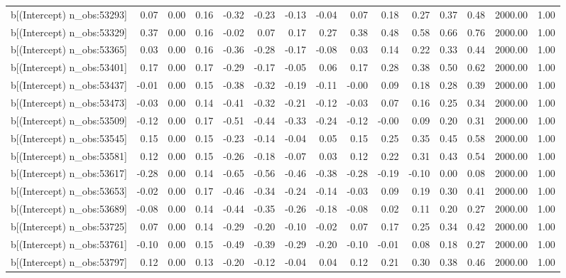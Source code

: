 \begin{table}[ht]
\begin{tabular}{rrrrrrrrrrrrrrr}
  b[(Intercept) n\_obs:53293] & 0.07 & 0.00 & 0.16 & -0.32 & -0.23 & -0.13 & -0.04 & 0.07 & 0.18 & 0.27 & 0.37 & 0.48 & 2000.00 & 1.00 \\ 
  b[(Intercept) n\_obs:53329] & 0.37 & 0.00 & 0.16 & -0.02 & 0.07 & 0.17 & 0.27 & 0.38 & 0.48 & 0.58 & 0.66 & 0.76 & 2000.00 & 1.00 \\ 
  b[(Intercept) n\_obs:53365] & 0.03 & 0.00 & 0.16 & -0.36 & -0.28 & -0.17 & -0.08 & 0.03 & 0.14 & 0.22 & 0.33 & 0.44 & 2000.00 & 1.00 \\ 
  b[(Intercept) n\_obs:53401] & 0.17 & 0.00 & 0.17 & -0.29 & -0.17 & -0.05 & 0.06 & 0.17 & 0.28 & 0.38 & 0.50 & 0.62 & 2000.00 & 1.00 \\ 
  b[(Intercept) n\_obs:53437] & -0.01 & 0.00 & 0.15 & -0.38 & -0.32 & -0.19 & -0.11 & -0.00 & 0.09 & 0.18 & 0.28 & 0.39 & 2000.00 & 1.00 \\ 
  b[(Intercept) n\_obs:53473] & -0.03 & 0.00 & 0.14 & -0.41 & -0.32 & -0.21 & -0.12 & -0.03 & 0.07 & 0.16 & 0.25 & 0.34 & 2000.00 & 1.00 \\ 
  b[(Intercept) n\_obs:53509] & -0.12 & 0.00 & 0.17 & -0.51 & -0.44 & -0.33 & -0.24 & -0.12 & -0.00 & 0.09 & 0.20 & 0.31 & 2000.00 & 1.00 \\ 
  b[(Intercept) n\_obs:53545] & 0.15 & 0.00 & 0.15 & -0.23 & -0.14 & -0.04 & 0.05 & 0.15 & 0.25 & 0.35 & 0.45 & 0.58 & 2000.00 & 1.00 \\ 
  b[(Intercept) n\_obs:53581] & 0.12 & 0.00 & 0.15 & -0.26 & -0.18 & -0.07 & 0.03 & 0.12 & 0.22 & 0.31 & 0.43 & 0.54 & 2000.00 & 1.00 \\ 
  b[(Intercept) n\_obs:53617] & -0.28 & 0.00 & 0.14 & -0.65 & -0.56 & -0.46 & -0.38 & -0.28 & -0.19 & -0.10 & 0.00 & 0.08 & 2000.00 & 1.00 \\ 
  b[(Intercept) n\_obs:53653] & -0.02 & 0.00 & 0.17 & -0.46 & -0.34 & -0.24 & -0.14 & -0.03 & 0.09 & 0.19 & 0.30 & 0.41 & 2000.00 & 1.00 \\ 
  b[(Intercept) n\_obs:53689] & -0.08 & 0.00 & 0.14 & -0.44 & -0.35 & -0.26 & -0.18 & -0.08 & 0.02 & 0.11 & 0.20 & 0.27 & 2000.00 & 1.00 \\ 
  b[(Intercept) n\_obs:53725] & 0.07 & 0.00 & 0.14 & -0.29 & -0.20 & -0.10 & -0.02 & 0.07 & 0.17 & 0.25 & 0.34 & 0.42 & 2000.00 & 1.00 \\ 
  b[(Intercept) n\_obs:53761] & -0.10 & 0.00 & 0.15 & -0.49 & -0.39 & -0.29 & -0.20 & -0.10 & -0.01 & 0.08 & 0.18 & 0.27 & 2000.00 & 1.00 \\ 
  b[(Intercept) n\_obs:53797] & 0.12 & 0.00 & 0.13 & -0.20 & -0.12 & -0.04 & 0.04 & 0.12 & 0.21 & 0.30 & 0.38 & 0.46 & 2000.00 & 1.00 \\ 

\end{tabular}
\end{table}
